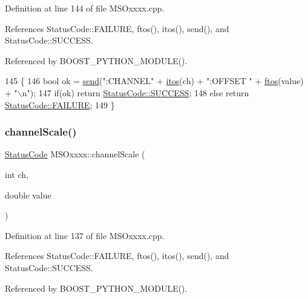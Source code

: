 Definition at line 144 of file M\+S\+Oxxxx.\+cpp.



References Status\+Code\+::\+F\+A\+I\+L\+U\+RE, ftos(), itos(), send(), and Status\+Code\+::\+S\+U\+C\+C\+E\+SS.



Referenced by B\+O\+O\+S\+T\+\_\+\+P\+Y\+T\+H\+O\+N\+\_\+\+M\+O\+D\+U\+L\+E().


\begin{DoxyCode}
145 \{
146     \textcolor{keywordtype}{bool} ok = \hyperlink{classMSOxxxx_ae77668a1ae4ccb74e0ed5f2485dfdebf}{send}(\textcolor{stringliteral}{":CHANNEL"} + \hyperlink{Tools_8h_af330027dbdafb9a30768b3613c553e60}{itos}(ch) + \textcolor{stringliteral}{":OFFSET "} + \hyperlink{classMSOxxxx_ab9c897c3dc0a52cbe5a5da67fc520ed7}{ftos}(value) + \textcolor{stringliteral}{"\(\backslash\)n"});
147     \textcolor{keywordflow}{if}(ok)  \textcolor{keywordflow}{return} \hyperlink{classStatusCode_a6f565cbeadc76d14c72f047e5e85eb4badd0da38d3ba0d922efd1f4619bc37ad8}{StatusCode::SUCCESS};
148     \textcolor{keywordflow}{else}        \textcolor{keywordflow}{return} \hyperlink{classStatusCode_a6f565cbeadc76d14c72f047e5e85eb4ba3da73d4c469762eb9d3c960368252b26}{StatusCode::FAILURE};
149 \}
\end{DoxyCode}
\mbox{\label{classMSOxxxx_ae08131dd88d4d7f95e870b69b2f5e0e6}} 
\subsubsection{\texorpdfstring{channel\+Scale()}{channelScale()}}
{\footnotesize\ttfamily \hyperlink{classStatusCode}{Status\+Code} M\+S\+Oxxxx\+::channel\+Scale (\begin{DoxyParamCaption}\item[{int}]{ch,  }\item[{double}]{value }\end{DoxyParamCaption})}



Definition at line 137 of file M\+S\+Oxxxx.\+cpp.



References Status\+Code\+::\+F\+A\+I\+L\+U\+RE, ftos(), itos(), send(), and Status\+Code\+::\+S\+U\+C\+C\+E\+SS.



Referenced by B\+O\+O\+S\+T\+\_\+\+P\+Y\+T\+H\+O\+N\+\_\+\+M\+O\+D\+U\+L\+E().


